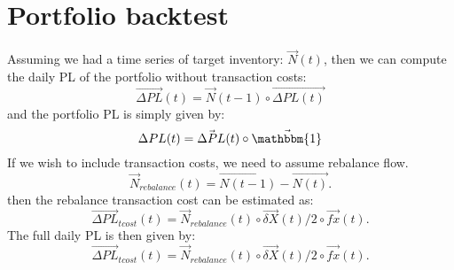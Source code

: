 \documentclass{book}
\begin{document}
\section{Portfolio backtest}
Assuming we had a time series of target inventory: $\vec{N}(t)$, then we can compute the daily PL of the portfolio without transaction costs:
\begin{equation}
\vec{\Delta PL}(t) = \vec{N}(t-1) \circ \vec{\Delta PL (t)} 
\end{equation}
and the portfolio PL is simply given by:
\begin{equation}
\Delta PL (t) = \vec{\Delta PL}(t) \circ \vec{\mathbbm{1}}
\end{equation}
If we wish to include transaction costs, we need to assume rebalance flow. 
\begin{equation}
\vec{N}_{rebalance}(t) = \vec{N(t-1)} - \vec{N(t)}.
\end{equation}
then the rebalance transaction cost can be estimated as:
\begin{equation}
\vec{\Delta PL}_{tcost}(t) = \vec{N}_{rebalance}(t)\circ \vec{\delta X}(t)/2 \circ \vec{fx}(t).
\end{equation}
The full daily PL is then given by:
\begin{equation}
\vec{\Delta PL}_{tcost}(t) = \vec{N}_{rebalance}(t)\circ \vec{\delta X}(t)/2 \circ \vec{fx}(t).
\end{equation}
\end{document}
